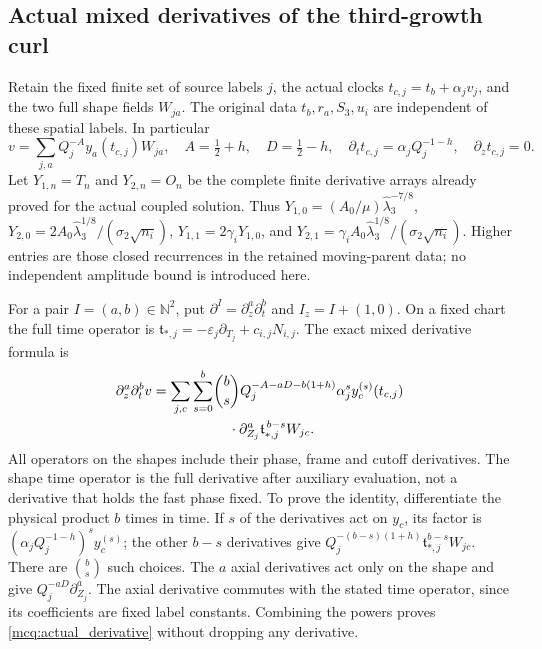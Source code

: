 \subsection{Actual mixed derivatives of the third-growth curl}

Retain the fixed finite set of source labels \(j\), the actual clocks
\(t_{c,j}=t_b+\alpha_jv_j\), and the two full shape fields \(W_{ja}\).
The original data \(t_b,r_a,S_3,u_i\) are independent of these spatial
labels. In particular
\[
 v=\sum_{j,a}Q_j^{-A}y_a(t_{c,j})W_{ja},\quad
 A=\tfrac12+h,\quad D=\tfrac12-h,\quad
 \partial_t t_{c,j}=\alpha_jQ_j^{-1-h},\quad \partial_z t_{c,j}=0 .
\]
Let \(Y_{1,n}=T_n\) and \(Y_{2,n}=O_n\) be the complete finite
derivative arrays already proved for the actual coupled solution.
Thus \(Y_{1,0}=(A_0/\mu)\widehat\lambda_3^{-7/8}\),
\(Y_{2,0}=2A_0\widehat\lambda_3^{1/8}/(\sigma_2\sqrt{n_i})\),
\(Y_{1,1}=2\gamma_iY_{1,0}\), and
\(Y_{2,1}=\gamma_iA_0\widehat\lambda_3^{1/8}/(\sigma_2\sqrt{n_i})\).
Higher entries are those closed recurrences in the retained moving-parent
data; no independent amplitude bound is introduced here.

For a pair \(I=(a,b)\in\mathbb N^2\), put
\(\partial^I=\partial_z^a\partial_t^b\) and
\(I_z=I+(1,0)\). On a fixed chart the full time operator is
\(\mathfrak t_{*,j}=-\varepsilon_j\partial_{T_j}+c_{i,j}N_{i,j}\).
The exact mixed derivative formula is
\begin{equation}\label{mcq:actual_derivative}
\begin{split}
 \partial_z^a\partial_t^b v
 =\sum_{j,c}\sum_{s=0}^b&
 \binom bs Q_j^{-A-aD-b(1+h)}\alpha_j^s
 y_c^{(s)}(t_{c,j})\\
 &\hspace{4mm}\cdot
 \partial_{Z_j}^a\mathfrak t_{*,j}^{\,b-s}W_{jc}.
\end{split}
\end{equation}
All operators on the shapes include their phase, frame and cutoff
derivatives. The shape time operator is the full derivative after
auxiliary evaluation, not a derivative that holds the fast phase fixed.
To prove the identity, differentiate the physical product \(b\) times
in time. If \(s\) of the derivatives act on \(y_c\), its factor is
\((\alpha_jQ_j^{-1-h})^sy_c^{(s)}\); the other \(b-s\) derivatives
give \(Q_j^{-(b-s)(1+h)}\mathfrak t_{*,j}^{b-s}W_{jc}\).
There are \(\binom bs\) such choices. The \(a\) axial derivatives act
only on the shape and give \(Q_j^{-aD}\partial_{Z_j}^a\).
The axial derivative commutes with the stated time operator, since
its coefficients are fixed label constants. Combining the powers proves
\eqref{mcq:actual_derivative} without dropping any derivative.

